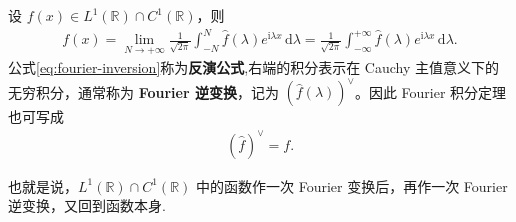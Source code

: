 \documentclass[../../main.tex]{subfiles}%
\begin{document}
\begin{theorem}[Fourier积分定理]
设 $f(x)\in L^1(\mathbb{R})\cap C^1(\mathbb{R})$，则
\begin{align}
f(x)=\lim_{N\rightarrow +\infty} \frac{1}{\sqrt{2\pi}}\int_{-N}^N{\hat{f}(\lambda )e^{\mathrm{i}\lambda x}\,\mathrm{d}\lambda}=\frac{1}{\sqrt{2\pi}}\int_{-\infty}^{+\infty}{\hat{f}(\lambda )e^{\mathrm{i}\lambda x}\,\mathrm{d}\lambda}.\label{eq:fourier-inversion}
\end{align}
公式\eqref{eq:fourier-inversion}称为\textbf{反演公式},右端的积分表示在 Cauchy 主值意义下的无穷积分，通常称为 \textbf{Fourier 逆变换}，记为 $(\hat{f}(\lambda))^\vee$。因此 Fourier 积分定理也可写成
\begin{align*}
(\hat{f})^\vee=f.
\end{align*}
\end{theorem}
\begin{remark}
也就是说，$L^1(\mathbb{R})\cap C^1(\mathbb{R})$ 中的函数作一次 Fourier 变换后，再作一次 Fourier 逆变换，又回到函数本身.
\end{remark}
\end{document}

